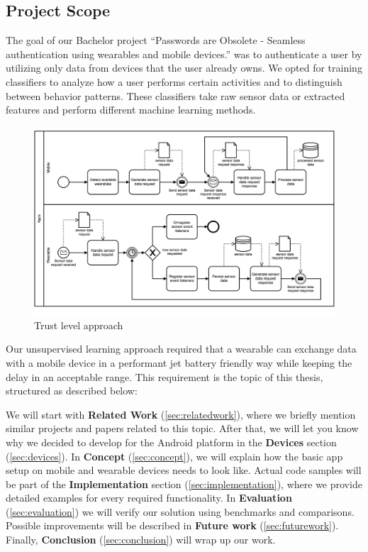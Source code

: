 \subsection{Project Scope}
\label{sec:intro:scope}
The goal of our Bachelor project ``Passwords are Obsolete - Seamless authentication using wearables and mobile devices.'' was to authenticate a user by utilizing only data from devices that the user already owns.
We opted for training classifiers to analyze how a user performs certain activities and to distinguish between behavior patterns. These classifiers take raw sensor data or extracted features and perform different machine learning methods.

\begin{figure}[H]
	\includegraphics[width=\linewidth]{diagrams/apps.png}
	\caption[Caption for bpmn]{Trust level approach}
	\label{fig:diagrams:approach}
\end{figure}

Our unsupervised learning approach required that a wearable can exchange data with a mobile device in a performant jet battery friendly way while keeping the delay in an acceptable range.
This requirement is the topic of this thesis, structured as described below:

We will start with \textbf{Related Work} (\ref{sec:relatedwork}), where we briefly mention similar projects and papers related to this topic.
After that, we will let you know why we decided to develop for the Android platform in the \textbf{Devices} section (\ref{sec:devices}).
In \textbf{Concept} (\ref{sec:concept}), we will explain how the basic app setup on mobile and wearable devices needs to look like.
Actual code samples will be part of the \textbf{Implementation} section (\ref{sec:implementation}), where we provide detailed examples for every required functionality.
In \textbf{Evaluation} (\ref{sec:evaluation}) we will verify our solution using benchmarks and comparisons.
Possible improvements will be described in \textbf{Future work} (\ref{sec:futurework}).
Finally, \textbf{Conclusion} (\ref{sec:conclusion}) will wrap up our work.


\clearpage